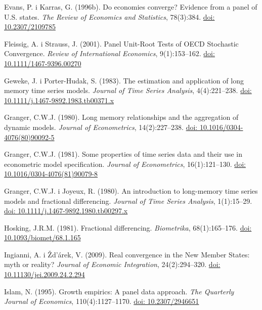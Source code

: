 \documentclass{crebsshr}
\begin{document}
\begin{thebibliography}{99}
Evans, P. i Karras, G. (1996b). Do economies converge? Evidence from a panel of U.S. states.
\emph{The Review of Economics and Statistics}, 78(3):384.
\href{https://doi.org/10.2307/2109785}{doi: 10.2307/2109785}

Fleissig, A. i Strauss, J. (2001). Panel Unit-Root Tests of OECD Stochastic Convergence.
\emph{Review of International Economics}, 9(1):153--162.
\href{https://doi.org/10.1111/1467-9396.00270}{doi: 10.1111/1467-9396.00270}

Geweke, J. i Porter-Hudak, S. (1983). The estimation and application of long memory
time series models.
\emph{Journal of Time Series Analysis}, 4(4):221--238.
\href{https://doi.org/10.1111/j.1467-9892.1983.tb00371.x}{doi: 10.1111/j.1467-9892.1983.tb00371.x}

Granger, C.W.J. (1980). Long memory relationships and the aggregation of dynamic models.
\emph{Journal of Econometrics}, 14(2):227--238.
\href{https://doi.org/10.1016/0304-4076(80)90092-5}{doi: 10.1016/0304-4076(80)90092-5}

Granger, C.W.J. (1981). Some properties of time series data and their use
in econometric model specification.
\emph{Journal of Econometrics}, 16(1):121--130.
\href{https://doi.org/10.1016/0304-4076(81)90079-8}{doi: 10.1016/0304-4076(81)90079-8}

Granger, C.W.J. i Joyeux, R. (1980). An introduction to long-memory time series models
and fractional differencing.
\emph{Journal of Time Series Analysis}, 1(1):15--29.
\href{https://doi.org/10.1111/j.1467-9892.1980.tb00297.x}{doi: 10.1111/j.1467-9892.1980.tb00297.x}

Hosking, J.R.M. (1981). Fractional differencing.
\emph{Biometrika}, 68(1):165--176.
\href{https://doi.org/10.1093/biomet/68.1.165}{doi: 10.1093/biomet/68.1.165}

Ingianni, A. i Žd’árek, V. (2009). Real convergence in the New Member States:
myth or reality?
\emph{Journal of Economic Integration}, 24(2):294--320.
\href{https://doi.org/10.11130/jei.2009.24.2.294}{doi: 10.11130/jei.2009.24.2.294}

Islam, N. (1995). Growth empirics: A panel data approach.
\emph{The Quarterly Journal of Economics}, 110(4):1127--1170.
\href{https://doi.org/10.2307/2946651}{doi: 10.2307/2946651}


\end{thebibliography}
\end{document}
